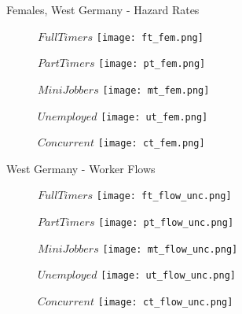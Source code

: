 \documentclass{beamer}
\begin{document}
\begin{frame}{Females, West Germany - Hazard Rates}
\begin{figure}[!t]
\centering
\begin{minipage}[b]{0.3\textwidth}{$Full Timers$}
\centering
\texttt{[image: ft\_fem.png]}
\end{minipage}
\begin{minipage}[b]{0.3\textwidth}{$Part Timers$}
\centering
\texttt{[image: pt\_fem.png]}
\end{minipage}
\begin{minipage}[b]{0.3\textwidth}{$Mini Jobbers$}
\centering
\texttt{[image: mt\_fem.png]}
\end{minipage}
\end{figure}
\begin{figure}[!t]
\centering
\begin{minipage}[b]{0.3\textwidth}{$Unemployed$}
\centering
\texttt{[image: ut\_fem.png]}
\end{minipage}
\begin{minipage}[b]{0.3\textwidth}{$Concurrent$}
\centering
\texttt{[image: ct\_fem.png]}
\end{minipage}
\end{figure}
\end{frame}

\begin{frame}{West Germany - Worker Flows}
\begin{figure}[!t]
\centering
\begin{minipage}[b]{0.3\textwidth}{$Full Timers$}
\centering
\texttt{[image: ft\_flow\_unc.png]}
\end{minipage}
\begin{minipage}[b]{0.3\textwidth}{$Part Timers$}
\centering
\texttt{[image: pt\_flow\_unc.png]}
\end{minipage}
\begin{minipage}[b]{0.3\textwidth}{$Mini Jobbers$}
\centering
\texttt{[image: mt\_flow\_unc.png]}
\end{minipage}
\end{figure}
\begin{figure}[!t]
\centering
\begin{minipage}[b]{0.3\textwidth}{$Unemployed$}
\centering
\texttt{[image: ut\_flow\_unc.png]}
\end{minipage}
\begin{minipage}[b]{0.3\textwidth}{$Concurrent$}
\centering
\texttt{[image: ct\_flow\_unc.png]}
\end{minipage}
\end{figure}
\end{frame}
\end{document}
